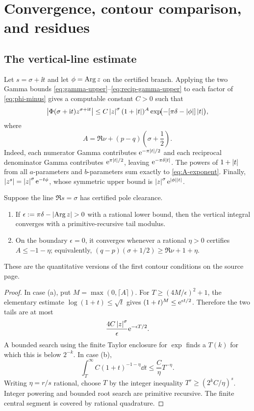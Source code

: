 \section{Convergence, contour comparison, and residues}\label{sec:convergence}

\subsection{The vertical-line estimate}

Let $s=\sigma+\ii t$ and let $\phi=\operatorname{Arg} z$ on the certified branch.  Applying
the two Gamma bounds \eqref{eq:gamma-upper}--\eqref{eq:recip-gamma-upper} to
each factor of \eqref{eq:phi-minus} gives a computable constant $C>0$ such
that
\begin{equation}\label{eq:master-vertical-bound}
 \left|\Phi(\sigma+\mathrm i t)z^{\sigma+\mathrm i t}\right|
 \le C\left|z\right|^\sigma(1+\left|t\right|)^A
      \exp\!\bigl(-[\pi\delta-\left|\phi\right|]\left|t\right|\bigr),
\end{equation}
where
\begin{equation}\label{eq:A-exponent}
 A=\Re\nu+(p-q)\left(\sigma+\frac12\right).
\end{equation}
Indeed, each numerator Gamma contributes $\mathrm e^{-\pi\left|t\right|/2}$ and each
reciprocal denominator Gamma contributes $\mathrm e^{\pi\left|t\right|/2}$, leaving
$\mathrm e^{-\pi\delta\left|t\right|}$.  The powers of $1+\left|t\right|$ from all $a$-parameters and
$b$-parameters sum exactly to \eqref{eq:A-exponent}.  Finally,
$\left|z^s\right|=\left|z\right|^\sigma\mathrm e^{-t\phi}$, whose symmetric upper bound is
$\left|z\right|^\sigma\mathrm e^{\left|\phi\right|\left|t\right|}$.

\begin{theorem}\label{thm:vertical-convergence}
Suppose the line $\Re s=\sigma$ has certified pole clearance.
\begin{enumerate}[label=(\alph*)]
\item If $\epsilon:=\pi\delta-\abs{\Arg z}>0$ with a rational lower bound,
      then the vertical integral converges with a primitive-recursive tail
      modulus.
\item On the boundary $\epsilon=0$, it converges whenever a rational
      $\eta>0$ certifies $A\le-1-\eta$; equivalently,
      $(q-p)(\sigma+1/2)\ge\Re\nu+1+\eta$.
\end{enumerate}
These are the quantitative versions of the first contour conditions on the
source page.
\end{theorem}
\begin{proof}
In case (a), put $M=\max(0,\lceil A\rceil)$.  For
$T\ge(4M/\epsilon)^2+1$, the elementary estimate
$\log(1+t)\le\sqrt t$ gives
$(1+t)^M\le\mathrm e^{\epsilon t/2}$.  Therefore the two tails are at most
\[
 \frac{4C\left|z\right|^\sigma}{\epsilon}\mathrm e^{-\epsilon T/2}.
\]
A bounded search using the finite Taylor enclosure for $\exp$ finds a $T(k)$
for which this is below $2^{-k}$.  In case (b),
\[
 \int_T^\infty C(1+t)^{-1-\eta}\dd t
 \le \frac C\eta T^{-\eta}.
\]
Writing $\eta=r/s$ rational, choose $T$ by the integer inequality
$T^r\ge(2^kC/\eta)^s$.  Integer powering and bounded root search are primitive
recursive.  The finite central segment is covered by rational quadrature.
\end{proof}

